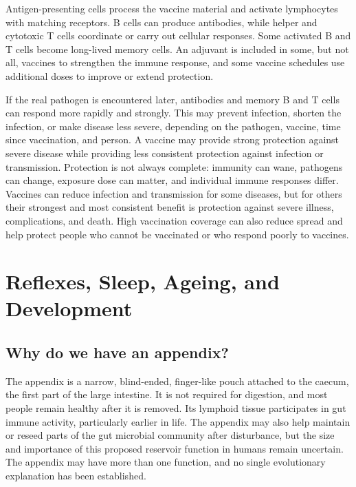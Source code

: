 \documentclass[11pt,oneside]{report}
\begin{document}
Antigen-presenting cells process the vaccine material and activate lymphocytes
with matching receptors. B cells can produce antibodies, while helper and
cytotoxic T cells coordinate or carry out cellular responses. Some activated B
and T cells become long-lived memory cells. An adjuvant is included in some,
but not all, vaccines to strengthen the immune response, and some vaccine
schedules use additional doses to improve or extend protection.

If the real pathogen is encountered later, antibodies and memory B and T cells
can respond more rapidly and strongly. This may prevent infection, shorten the
infection, or make disease less severe, depending on the pathogen, vaccine,
time since vaccination, and person. A vaccine may provide strong protection
against severe disease while providing less consistent protection against
infection or transmission.
Protection is not always complete: immunity can wane, pathogens can change,
exposure dose can matter, and individual immune responses differ. Vaccines can
reduce infection and transmission for some diseases, but for others their
strongest and most consistent benefit is protection against severe illness,
complications, and death. High vaccination coverage can also reduce spread and
help protect people who cannot be vaccinated or who respond poorly to vaccines.

\chapter{Reflexes, Sleep, Ageing, and Development}

\section{Why do we have an appendix?}

The appendix is a narrow, blind-ended, finger-like pouch attached to the caecum,
the first part of the large intestine. It is not required for digestion, and
most people remain healthy after it is removed. Its lymphoid tissue participates
in gut immune activity, particularly earlier in life. The appendix may also
help maintain or reseed parts of the gut microbial community after disturbance,
but the size and importance of this proposed reservoir function in humans remain
uncertain. The appendix may have more than one function, and no single
evolutionary explanation has been established.
\end{document}
